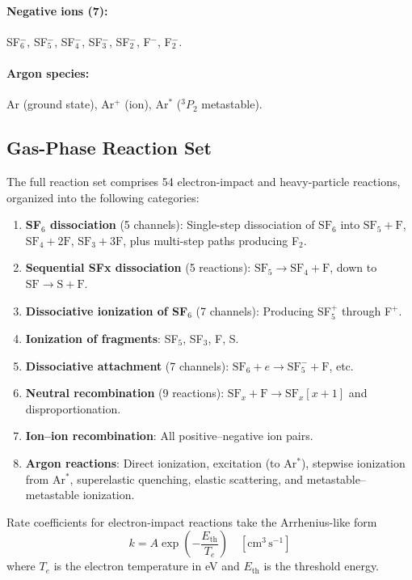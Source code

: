 \documentclass[11pt,a4paper]{report}
\newcommand{\SFx}{\mathrm{SF}_x}
\newcommand{\SFsix}{\mathrm{SF}_6}
\newcommand{\SFfive}{\mathrm{SF}_5}
\newcommand{\SFfour}{\mathrm{SF}_4}
\newcommand{\SFthree}{\mathrm{SF}_3}
\newcommand{\Te}{T_e}
\begin{document}
\paragraph{Negative ions (7):} SF$_6^-$, SF$_5^-$, SF$_4^-$, SF$_3^-$, SF$_2^-$, F$^-$, F$_2^-$.

\paragraph{Argon species:} Ar (ground state), Ar$^+$ (ion), Ar$^*$ (${}^3P_2$ metastable).

\subsection{Gas-Phase Reaction Set}
\label{sec:gasphase_rxnset}

The full reaction set comprises 54 electron-impact and heavy-particle reactions, organized into the following categories:

\begin{enumerate}[label=(\roman*)]
\item \textbf{SF$_6$ dissociation} (5 channels): Single-step dissociation of $\SFsix$ into $\SFfive + \mathrm{F}$, $\SFfour + 2\mathrm{F}$, $\SFthree + 3\mathrm{F}$, plus multi-step paths producing F$_2$.
\item \textbf{Sequential SFx dissociation} (5 reactions): $\SFfive \to \SFfour + \mathrm{F}$, down to $\mathrm{SF} \to \mathrm{S} + \mathrm{F}$.
\item \textbf{Dissociative ionization of SF$_6$} (7 channels): Producing SF$_5^+$ through F$^+$.
\item \textbf{Ionization of fragments}: SF$_5$, SF$_3$, F, S.
\item \textbf{Dissociative attachment} (7 channels): $\SFsix + e \to \SFfive^- + \mathrm{F}$, etc.
\item \textbf{Neutral recombination} (9 reactions): $\SFx + \mathrm{F} \to \SFx[x+1]$ and disproportionation.
\item \textbf{Ion--ion recombination}: All positive--negative ion pairs.
\item \textbf{Argon reactions}: Direct ionization, excitation (to Ar$^*$), stepwise ionization from Ar$^*$, superelastic quenching, elastic scattering, and metastable--metastable ionization.
\end{enumerate}

Rate coefficients for electron-impact reactions take the Arrhenius-like form
\begin{equation}
k = A \exp\!\left(-\frac{E_\mathrm{th}}{\Te}\right) \quad [\text{cm}^3\,\text{s}^{-1}]
\label{eq:gas_arrhenius}
\end{equation}
where $\Te$ is the electron temperature in eV and $E_\mathrm{th}$ is the threshold energy.
\end{document}
